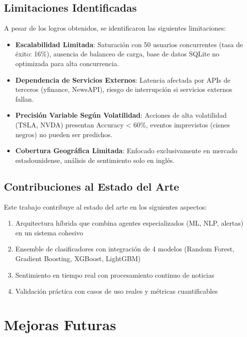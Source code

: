 \subsection{Limitaciones Identificadas}

A pesar de los logros obtenidos, se identificaron las siguientes limitaciones:

\begin{itemize}
    \item \textbf{Escalabilidad Limitada}: Saturación con 50 usuarios concurrentes (tasa de éxito: 16\%), ausencia de balanceo de carga, base de datos SQLite no optimizada para alta concurrencia.

    \item \textbf{Dependencia de Servicios Externos}: Latencia afectada por APIs de terceros (yfinance, NewsAPI), riesgo de interrupción si servicios externos fallan.

    \item \textbf{Precisión Variable Según Volatilidad}: Acciones de alta volatilidad (TSLA, NVDA) presentan Accuracy < 60\%, eventos imprevistos (cisnes negros) no pueden ser predichos.

    \item \textbf{Cobertura Geográfica Limitada}: Enfocado exclusivamente en mercado estadounidense, análisis de sentimiento solo en inglés.
\end{itemize}

\subsection{Contribuciones al Estado del Arte}

Este trabajo contribuye al estado del arte en los siguientes aspectos:

\begin{enumerate}
    \item Arquitectura híbrida que combina agentes especializados (ML, NLP, alertas) en un sistema cohesivo
    \item Ensemble de clasificadores con integración de 4 modelos (Random Forest, Gradient Boosting, XGBoost, LightGBM)
    \item Sentimiento en tiempo real con procesamiento continuo de noticias
    \item Validación práctica con casos de uso reales y métricas cuantificables
\end{enumerate}

\section{Mejoras Futuras}

